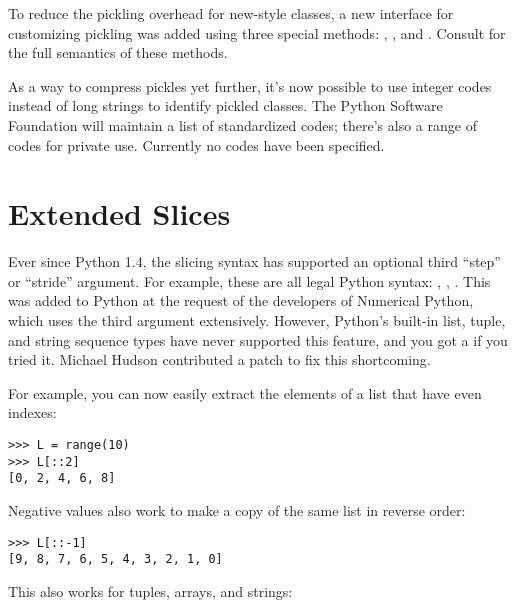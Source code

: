 \documentclass{howto}
\begin{document}
To reduce the pickling overhead for new-style classes, a new interface
for customizing pickling was added using three special methods:
, , and
.  Consult  for the full semantics 
of these methods.

As a way to compress pickles yet further, it's now possible to use
integer codes instead of long strings to identify pickled classes.
The Python Software Foundation will maintain a list of standardized
codes; there's also a range of codes for private use.  Currently no
codes have been specified.

\begin{seealso}


\end{seealso}

\section{Extended Slices\label{section-slices}}

Ever since Python 1.4, the slicing syntax has supported an optional
third ``step'' or ``stride'' argument.  For example, these are all
legal Python syntax: , ,
.  This was added to Python at the request of
the developers of Numerical Python, which uses the third argument
extensively.  However, Python's built-in list, tuple, and string
sequence types have never supported this feature, and you got a
 if you tried it.  Michael Hudson contributed a
patch to fix this shortcoming.

For example, you can now easily extract the elements of a list that
have even indexes:

\begin{verbatim}
>>> L = range(10)
>>> L[::2]
[0, 2, 4, 6, 8]
\end{verbatim}

Negative values also work to make a copy of the same list in reverse
order:

\begin{verbatim}
>>> L[::-1]
[9, 8, 7, 6, 5, 4, 3, 2, 1, 0]
\end{verbatim}

This also works for tuples, arrays, and strings:
\end{document}
